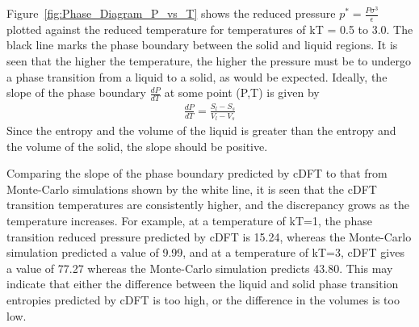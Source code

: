 \documentclass[double,12pt]{beavtex}
\begin{document}
Figure~\ref{fig:Phase_Diagram_P_vs_T} shows the reduced pressure 
$p^*=\frac{P\sigma^3}{\epsilon}$ plotted against the reduced temperature 
for temperatures of kT = 0.5 to 3.0. 
The black line marks the phase boundary between the solid and liquid regions. 
It is seen that the higher the temperature, the higher the pressure must be
to undergo a phase transition from a liquid to a solid, as would be expected. 
Ideally, the slope of the phase boundary $\frac{dP}{dT}$ at some point (P,T) is given by
\begin{align} 
    \frac{dP}{dT}=\frac{S_l-S_s}{V_l-V_s}
\end{align}
Since the entropy and the volume of the liquid is greater than the entropy
and the volume of the solid, the slope should be positive. 

Comparing the slope of the phase boundary predicted by cDFT to that
from Monte-Carlo simulations shown by the white line, it is seen that
the cDFT transition temperatures are consistently higher, and the 
discrepancy grows as the temperature increases. For example, at a 
temperature of kT=1, the phase transition reduced pressure predicted by 
cDFT is 15.24, whereas the Monte-Carlo simulation predicted a value of 9.99,
and at a temperature of kT=3, cDFT gives a value of 77.27 whereas the 
Monte-Carlo simulation predicts 43.80.
This may indicate that either the difference between the liquid 
and solid phase transition entropies predicted by cDFT is too high, or 
the difference in the volumes is too low. 
\end{document}
